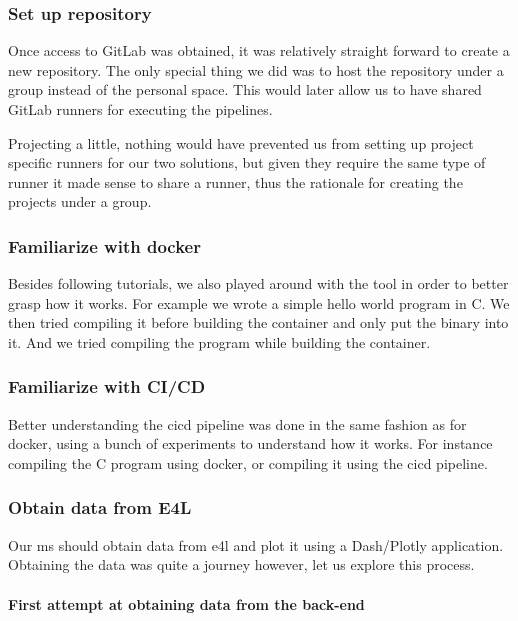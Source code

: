 \subsubsection{Set up repository}

Once access to GitLab was obtained, it was relatively straight forward
to create a new repository. The only special thing we did was to host
the repository under a group instead of the personal space. This would
later allow us to have shared GitLab runners for executing the
pipelines.

Projecting a little, nothing would have prevented us from setting up
project specific runners for our two solutions, but given they require
the same type of runner it made sense to share a runner, thus the
rationale for creating the projects under a group.

\subsubsection{Familiarize with docker}

Besides following tutorials, we also played around with the tool in
order to better grasp how it works. For example we wrote a simple
hello world program in C. We then tried compiling it before building
the container and only put the binary into it. And we tried compiling
the program while building the container.

\subsubsection{Familiarize with CI/CD}

Better understanding the \gls{cicd} pipeline was done in the same
fashion as for docker, using a bunch of experiments to understand how
it works. For instance compiling the C program using docker, or
compiling it using the \gls{cicd} pipeline.

\subsubsection{Obtain data from E4L}

Our \gls{ms} should obtain data from \gls{e4l} and plot it using
a Dash/Plotly application. Obtaining the data was quite a journey
however, let us explore this process.

\paragraph{First attempt at obtaining data from the back-end}

